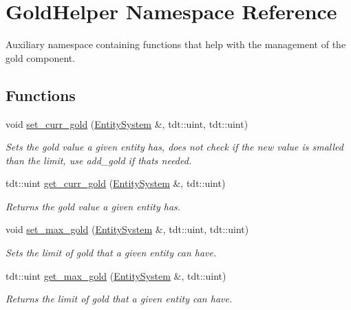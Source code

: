 \hypertarget{namespace_gold_helper}{}\section{Gold\+Helper Namespace Reference}
\label{namespace_gold_helper}


Auxiliary namespace containing functions that help with the management of the gold component.  


\subsection*{Functions}
\begin{DoxyCompactItemize}
\item 
void \hyperlink{namespace_gold_helper_a973b2005568ffa99421d01e980e6b90f}{set\+\_\+curr\+\_\+gold} (\hyperlink{class_entity_system}{Entity\+System} \&, tdt\+::uint, tdt\+::uint)
\begin{DoxyCompactList}\small\item\em Sets the gold value a given entity has, does not check if the new value is smalled than the limit, use add\+\_\+gold if that\textquotesingle{}s needed. \end{DoxyCompactList}\item 
tdt\+::uint \hyperlink{namespace_gold_helper_aee202a957ac4274a62f9644f43791705}{get\+\_\+curr\+\_\+gold} (\hyperlink{class_entity_system}{Entity\+System} \&, tdt\+::uint)
\begin{DoxyCompactList}\small\item\em Returns the gold value a given entity has. \end{DoxyCompactList}\item 
void \hyperlink{namespace_gold_helper_a63284175620f00f2fdcb14cead8455e6}{set\+\_\+max\+\_\+gold} (\hyperlink{class_entity_system}{Entity\+System} \&, tdt\+::uint, tdt\+::uint)
\begin{DoxyCompactList}\small\item\em Sets the limit of gold that a given entity can have. \end{DoxyCompactList}\item 
tdt\+::uint \hyperlink{namespace_gold_helper_af8397b479f7e8668c79269452c3839e6}{get\+\_\+max\+\_\+gold} (\hyperlink{class_entity_system}{Entity\+System} \&, tdt\+::uint)
\begin{DoxyCompactList}\small\item\em Returns the limit of gold that a given entity can have. \end{DoxyCompactList}\item 

\end{DoxyCompactItemize}

